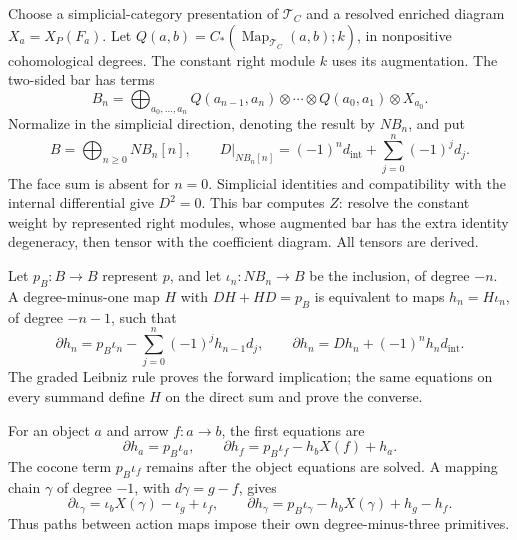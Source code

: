 Choose a simplicial-category presentation of
$\mathscr T_C$ and a resolved enriched diagram
$X_a=X_P(F_a)$. Let
$Q(a,b)=C_*(\operatorname{Map}_{\mathscr T_C}(a,b);k)$,
in nonpositive cohomological degrees. The constant
right module $k$ uses its augmentation. The two-sided
bar has terms
\begin{equation}\label{eq:vol2-action-bar}
 B_n=\bigoplus_{a_0,\ldots,a_n}
 Q(a_{n-1},a_n)\otimes\cdots\otimes Q(a_0,a_1)
                                      \otimes X_{a_0}.
\end{equation}
Normalize in the simplicial direction, denoting the
result by $NB_n$, and put
\[
 B=\bigoplus_{n\geq0}NB_n[n],\qquad
 D|_{NB_n[n]}=(-1)^nd_{\mathrm{int}}
                        +\sum_{j=0}^n(-1)^jd_j.
\]
The face sum is absent for $n=0$. Simplicial identities
and compatibility with the internal differential give
$D^2=0$. This bar computes $Z$: resolve the constant
weight by represented right modules, whose augmented
bar has the extra identity degeneracy, then tensor
with the coefficient diagram. All tensors are derived.

Let $p_B:B\to B$ represent $p$, and let
$\iota_n:NB_n\to B$ be the inclusion, of degree $-n$.
A degree-minus-one map $H$ with $DH+HD=p_B$ is
equivalent to maps $h_n=H\iota_n$, of degree $-n-1$,
such that
\begin{equation}\label{eq:vol2-full-primitive-equations}
 \partial h_n=p_B\iota_n-
              \sum_{j=0}^n(-1)^jh_{n-1}d_j,
 \qquad
 \partial h_n=Dh_n+(-1)^nh_nd_{\mathrm{int}}.
\end{equation}
The graded Leibniz rule proves the forward implication;
the same equations on every summand define $H$ on
the direct sum and prove the converse.

For an object $a$ and arrow $f:a\to b$, the first
equations are
\begin{equation}\label{eq:vol2-object-arrow-primitives}
 \partial h_a=p_B\iota_a,\qquad
 \partial h_f=p_B\iota_f-h_bX(f)+h_a.
\end{equation}
The cocone term $p_B\iota_f$ remains after the object
equations are solved. A mapping chain $\gamma$ of
degree $-1$, with $d\gamma=g-f$, gives
\[
 \partial\iota_\gamma=\iota_bX(\gamma)-\iota_g+\iota_f,
 \qquad
 \partial h_\gamma=p_B\iota_\gamma-h_bX(\gamma)+h_g-h_f.
\]
Thus paths between action maps impose their own
degree-minus-three primitives.


